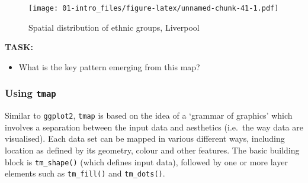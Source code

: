 \documentclass[]{book}
\providecommand{\tightlist}{%
  \setlength{\itemsep}{0pt}\setlength{\parskip}{0pt}}
\begin{document}
\begin{figure}
\centering
\texttt{[image: 01-intro\_files/figure-latex/unnamed-chunk-41-1.pdf]}
\caption{\label{fig:unnamed-chunk-41}Spatial distribution of ethnic groups,
Liverpool}
\end{figure}

\textbf{TASK:}

\begin{itemize}
\tightlist
\item
  What is the key pattern emerging from this map?
\end{itemize}

\subsubsection{\texorpdfstring{Using
\texttt{tmap}}{Using tmap}}\label{using-tmap}

Similar to \texttt{ggplot2}, \texttt{tmap} is based on the idea of a
`grammar of graphics' which involves a separation between the input data
and aesthetics (i.e.~the way data are visualised). Each data set can be
mapped in various different ways, including location as defined by its
geometry, colour and other features. The basic building block is
\texttt{tm\_shape()} (which defines input data), followed by one or more
layer elements such as \texttt{tm\_fill()} and \texttt{tm\_dots()}.
\end{document}
